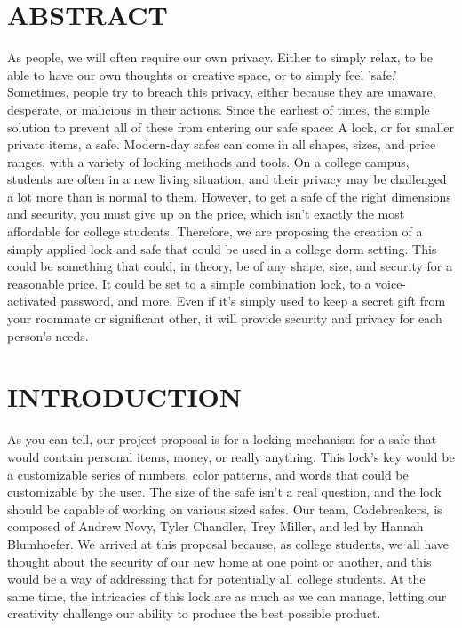\documentclass[12pt]{article}
\begin{document}
\tableofcontents
\pagebreak

\section{ABSTRACT}
As people, we will often require our own privacy. Either to simply relax, to be able to have our own thoughts or creative space, or to simply feel 'safe.' Sometimes, people try to breach this privacy, either because they are unaware, desperate, or malicious in their actions. Since the earliest of times, the simple solution to prevent all of these from entering our safe space: A lock, or for smaller private items, a safe. Modern-day safes can come in all shapes, sizes, and price ranges, with a variety of locking methods and tools. On a college campus, students are often in a new living situation, and their privacy may be challenged a lot more than is normal to them. However, to get a safe of the right dimensions and security, you must give up on the price, which isn't exactly the most affordable for college students. Therefore, we are proposing the creation of a simply applied lock and safe that could be used in a college dorm setting. This could be something that could, in theory, be of any shape, size, and security for a reasonable price. It could be set to a simple combination lock, to a voice-activated password, and more. Even if it's simply used to keep a secret gift from your roommate or significant other, it will provide security and privacy for each person's needs.

\section{INTRODUCTION}
As you can tell, our project proposal is for a locking mechanism for a safe that would contain personal items, money, or really anything. This lock’s key would be a customizable series of numbers, color patterns, and words that could be customizable by the user. The size of the safe isn’t a real question, and the lock should be capable of working on various sized safes.
Our team, Codebreakers, is composed of Andrew Novy, Tyler Chandler, Trey Miller, and led by Hannah Blumhoefer. We arrived at this proposal because, as college students, we all have thought about the security of our new home at one point or another, and this would be a way of addressing that for potentially all college students. At the same time, the intricacies of this lock are as much as we can manage, letting our creativity challenge our ability to produce the best possible product.
\end{document}

